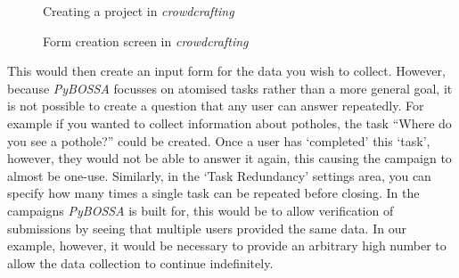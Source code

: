 \documentclass{article}
\begin{document}
		\begin{figure}[ht]
			\centering
			\caption{Creating a project in \emph{crowdcrafting}}
			\label{fig:cc-create}
		\end{figure}

		\begin{figure}[ht]
			\centering
			\caption{Form creation screen in \emph{crowdcrafting}}
			\label{fig:cc-present}
		\end{figure}

		This would then create an input form for the data you wish to collect. However, because \emph{PyBOSSA} focusses on atomised tasks rather than a more general goal, it is not possible to create a question that any user can answer repeatedly. For example if you wanted to collect information about potholes, the task ``Where do you see a pothole?'' could be created. Once a user has `completed' this `task', however, they would not be able to answer it again, this causing the campaign to almost be one-use. Similarly, in the `Task Redundancy' settings area, you can specify how many times a single task can be repeated before closing. In the campaigns \emph{PyBOSSA} is built for, this would be to allow verification of submissions by seeing that multiple users provided the same data. In our example, however, it would be necessary to provide an arbitrary high number to allow the data collection to continue indefinitely.
\end{document}
